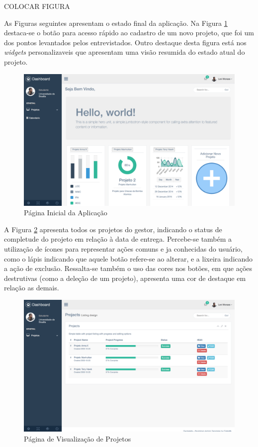 COLOCAR FIGURA




As Figuras seguintes apresentam o estado final da aplicação. Na Figura \ref{img:pag_inicial} destaca-se o botão para acesso rápido ao cadastro de um novo projeto, que foi um dos pontos levantados pelos entrevistados. Outro destaque desta figura está nos \textit{widgets} personalizaveis que apresentam uma visão resumida do estado atual do projeto.

\graphicspath{{figuras/}}
\begin{figure}[h!]
\centering
\includegraphics[scale=0.35]{pagina_inicial}
\caption{Página Inicial da Aplicação}
\label{img:pag_inicial}
\end{figure}

A Figura \ref{img:pag_visual} apresenta todos os projetos do gestor, indicando o status de completude do projeto em relação à data de entrega. Percebe-se também a utilização de ícones para representar ações comuns e ja conhecidas do usuário, como o lápis indicando que aquele botão refere-se ao alterar, e a lixeira indicando a ação de exclusão. Ressalta-se também o uso das cores nos botões, em que ações destrutivas (como a deleção de um projeto), apresenta uma cor de destaque em relação as demais.


\graphicspath{{figuras/}}
\begin{figure}[h]
\centering
\includegraphics[scale=0.35]{visualizacao_projetos}
\caption{Página de Visualização de Projetos}
\label{img:pag_visual}
\end{figure}


